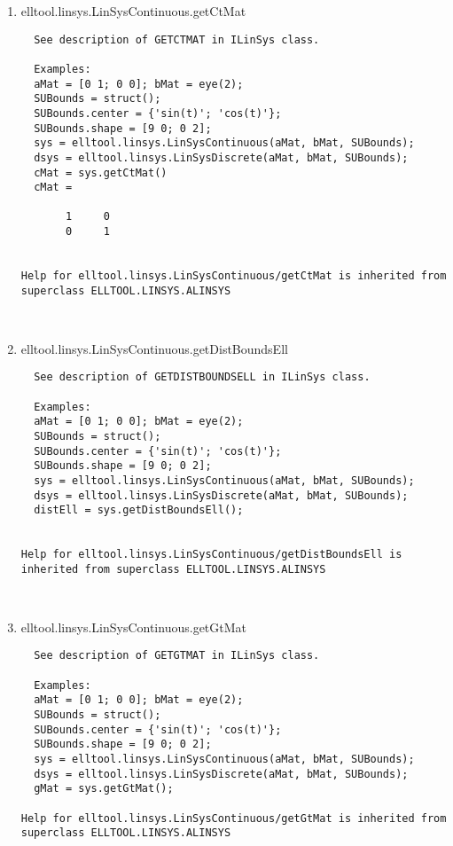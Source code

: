 \begin{enumerate}
\begin{lstlisting}
\end{lstlisting}
\fontfamily{\familydefault}
\selectfont
\item {elltool.linsys.LinSysContinuous.getCtMat}
\selectfont
\begin{lstlisting}
  See description of GETCTMAT in ILinSys class.

  Examples:
  aMat = [0 1; 0 0]; bMat = eye(2);
  SUBounds = struct();
  SUBounds.center = {'sin(t)'; 'cos(t)'};
  SUBounds.shape = [9 0; 0 2];
  sys = elltool.linsys.LinSysContinuous(aMat, bMat, SUBounds);
  dsys = elltool.linsys.LinSysDiscrete(aMat, bMat, SUBounds);
  cMat = sys.getCtMat()
  cMat =

       1     0
       0     1


Help for elltool.linsys.LinSysContinuous/getCtMat is inherited from superclass ELLTOOL.LINSYS.ALINSYS



\end{lstlisting}
\fontfamily{\familydefault}
\selectfont
\item {elltool.linsys.LinSysContinuous.getDistBoundsEll}
\selectfont
\begin{lstlisting}
  See description of GETDISTBOUNDSELL in ILinSys class.

  Examples:
  aMat = [0 1; 0 0]; bMat = eye(2);
  SUBounds = struct();
  SUBounds.center = {'sin(t)'; 'cos(t)'};
  SUBounds.shape = [9 0; 0 2];
  sys = elltool.linsys.LinSysContinuous(aMat, bMat, SUBounds);
  dsys = elltool.linsys.LinSysDiscrete(aMat, bMat, SUBounds);
  distEll = sys.getDistBoundsEll();


Help for elltool.linsys.LinSysContinuous/getDistBoundsEll is inherited from superclass ELLTOOL.LINSYS.ALINSYS



\end{lstlisting}
\fontfamily{\familydefault}
\selectfont
\item {elltool.linsys.LinSysContinuous.getGtMat}
\selectfont
\begin{lstlisting}
  See description of GETGTMAT in ILinSys class.

  Examples:
  aMat = [0 1; 0 0]; bMat = eye(2);
  SUBounds = struct();
  SUBounds.center = {'sin(t)'; 'cos(t)'};
  SUBounds.shape = [9 0; 0 2];
  sys = elltool.linsys.LinSysContinuous(aMat, bMat, SUBounds);
  dsys = elltool.linsys.LinSysDiscrete(aMat, bMat, SUBounds);
  gMat = sys.getGtMat();

Help for elltool.linsys.LinSysContinuous/getGtMat is inherited from superclass ELLTOOL.LINSYS.ALINSYS




\end{lstlisting}
\end{enumerate}
